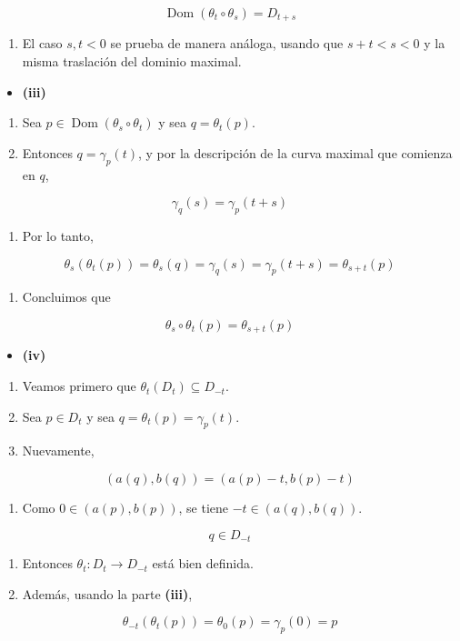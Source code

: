 \begin{bookproof}{}
\[
\operatorname{Dom}(\theta_t\circ\theta_s)=D_{t+s}
\]
\begin{enumerate}[start=14]
\item El caso $s,t<0$ se prueba de manera análoga, usando que $s+t<s<0$ y la misma traslación del dominio maximal.
\end{enumerate}
\begin{itemize}
\item \textbf{(iii)}
\end{itemize}
\begin{enumerate}
\item Sea $p\in\operatorname{Dom}(\theta_s\circ\theta_t)$ y sea $q=\theta_t(p)$.
\item Entonces $q=\gamma_p(t)$, y por la descripción de la curva maximal que comienza en $q$,
\end{enumerate}
\[
\gamma_q(s)=\gamma_p(t+s)
\]
\begin{enumerate}[start=3]
\item Por lo tanto,
\end{enumerate}
\[
\theta_s(\theta_t(p))=\theta_s(q)=\gamma_q(s)=\gamma_p(t+s)=\theta_{s+t}(p)
\]
\begin{enumerate}[start=4]
\item Concluimos que
\end{enumerate}
\[
\theta_s\circ\theta_t(p)=\theta_{s+t}(p)
\]
\begin{itemize}
\item \textbf{(iv)}
\end{itemize}
\begin{enumerate}
\item Veamos primero que $\theta_t(D_t)\subseteq D_{-t}$.
\item Sea $p\in D_t$ y sea $q=\theta_t(p)=\gamma_p(t)$.
\item Nuevamente,
\end{enumerate}
\[
(a(q),b(q))=(a(p)-t,b(p)-t)
\]
\begin{enumerate}[start=4]
\item Como $0\in(a(p),b(p))$, se tiene $-t\in(a(q),b(q))$.
\end{enumerate}
\[
q\in D_{-t}
\]
\begin{enumerate}[start=5]
\item Entonces $\theta_t:D_t\to D_{-t}$ está bien definida.
\item Además, usando la parte \textbf{(iii)},
\end{enumerate}
\[
\theta_{-t}(\theta_t(p))=\theta_0(p)=\gamma_{p}(0)=p
\]
\begin{enumerate}[start=7]

\end{enumerate}
\end{bookproof}
